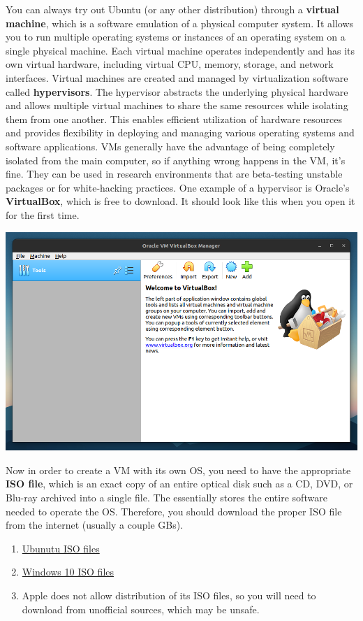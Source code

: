   You can always try out Ubuntu (or any other distribution) through a \textbf{virtual machine}, which is a software emulation of a physical computer system. It allows you to run multiple operating systems or instances of an operating system on a single physical machine. Each virtual machine operates independently and has its own virtual hardware, including virtual CPU, memory, storage, and network interfaces. Virtual machines are created and managed by virtualization software called \textbf{hypervisors}. The hypervisor abstracts the underlying physical hardware and allows multiple virtual machines to share the same resources while isolating them from one another. This enables efficient utilization of hardware resources and provides flexibility in deploying and managing various operating systems and software applications. VMs generally have the advantage of being completely isolated from the main computer, so if anything wrong happens in the VM, it's fine. They can be used in research environments that are beta-testing unstable packages or for white-hacking practices. One example of a hypervisor is Oracle's \textbf{VirtualBox}, which is free to download. It should look like this when you open it for the first time. 
  \begin{center}
      \includegraphics[scale=0.2]{img/VirtualBox.png}
  \end{center}
  Now in order to create a VM with its own OS, you need to have the appropriate \textbf{ISO file}, which is an exact copy of an entire optical disk such as a CD, DVD, or Blu-ray archived into a single file. The essentially stores the entire software needed to operate the OS. Therefore, you should download the proper ISO file from the internet (usually a couple GBs). 
  \begin{enumerate}
      \item \href{https://ubuntu.com/download/desktop}{Ubunutu ISO files}
      \item \href{https://www.microsoft.com/en-us/software-download/windows10}{Windows 10 ISO files}
      \item Apple does not allow distribution of its ISO files, so you will need to download from unofficial sources, which may be unsafe. 
  \end{enumerate}
